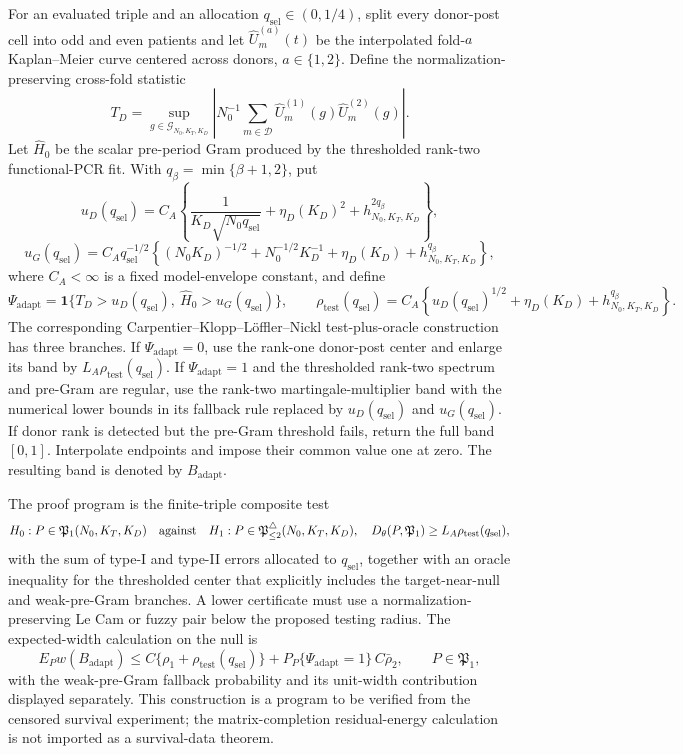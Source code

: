 For an evaluated triple and an allocation \(q_{\mathrm{sel}}\in(0,1/4)\), split every donor-post cell into odd and even patients and let \(\widehat U_m^{(a)}(t)\) be the interpolated fold-\(a\) Kaplan--Meier curve centered across donors, \(a\in\{1,2\}\).  Define the normalization-preserving cross-fold statistic
\[
 T_D=\sup_{g\in\mathcal G_{N_0,K_T,K_D}}
 \left|N_0^{-1}\sum_{m\in\mathcal D}
       \widehat U_m^{(1)}(g)\widehat U_m^{(2)}(g)\right|.
\]
Let \(\widehat H_0\) be the scalar pre-period Gram produced by the thresholded rank-two functional-PCR fit.  With \(q_\beta=\min\{\beta+1,2\}\), put
\[
 u_D(q_{\mathrm{sel}})=C_A\left\{
   \frac{1}{K_D\sqrt{N_0q_{\mathrm{sel}}}}
   +\eta_D(K_D)^2+h_{N_0,K_T,K_D}^{2q_\beta}\right\},
\]
\[
 u_G(q_{\mathrm{sel}})=C_Aq_{\mathrm{sel}}^{-1/2}\left\{
   (N_0K_D)^{-1/2}+N_0^{-1/2}K_D^{-1}
   +\eta_D(K_D)+h_{N_0,K_T,K_D}^{q_\beta}\right\},
\]
where \(C_A<\infty\) is a fixed model-envelope constant, and define
\[
 \Psi_{\mathrm{adapt}}
 =\mathbf 1\{T_D>u_D(q_{\mathrm{sel}}),\ \widehat H_0>u_G(q_{\mathrm{sel}})\},
 \qquad
 \rho_{\mathrm{test}}(q_{\mathrm{sel}})
 =C_A\left\{u_D(q_{\mathrm{sel}})^{1/2}
             +\eta_D(K_D)+h_{N_0,K_T,K_D}^{q_\beta}\right\}.
\]
The corresponding Carpentier--Klopp--L\"offler--Nickl test-plus-oracle construction has three branches.  If \(\Psi_{\mathrm{adapt}}=0\), use the rank-one donor-post center and enlarge its band by \(L_A\rho_{\mathrm{test}}(q_{\mathrm{sel}})\).  If \(\Psi_{\mathrm{adapt}}=1\) and the thresholded rank-two spectrum and pre-Gram are regular, use the rank-two martingale-multiplier band with the numerical lower bounds in its fallback rule replaced by \(u_D(q_{\mathrm{sel}})\) and \(u_G(q_{\mathrm{sel}})\).  If donor rank is detected but the pre-Gram threshold fails, return the full band \([0,1]\).  Interpolate endpoints and impose their common value one at zero.  The resulting band is denoted by \(B_{\mathrm{adapt}}\).

The proof program is the finite-triple composite test
\[
 H_0:P\in\mathfrak P_1(N_0,K_T,K_D)
 \quad\hbox{against}\quad
 H_1:P\in\mathfrak P_{\le2}^{\triangle}(N_0,K_T,K_D),\quad
 D_\theta(P,\mathfrak P_1)\ge L_A\rho_{\mathrm{test}}(q_{\mathrm{sel}}),
\]
with the sum of type-I and type-II errors allocated to \(q_{\mathrm{sel}}\), together with an oracle inequality for the thresholded center that explicitly includes the target-near-null and weak-pre-Gram branches.  A lower certificate must use a normalization-preserving Le Cam or fuzzy pair below the proposed testing radius.  The expected-width calculation on the null is
\[
 E_Pw(B_{\mathrm{adapt}})
 \le C\{\rho_1+\rho_{\mathrm{test}}(q_{\mathrm{sel}})\}
 +P_P\{\Psi_{\mathrm{adapt}}=1\}\,C\bar\rho_2,
 \qquad P\in\mathfrak P_1,
\]
with the weak-pre-Gram fallback probability and its unit-width contribution displayed separately.  This construction is a program to be verified from the censored survival experiment; the matrix-completion residual-energy calculation is not imported as a survival-data theorem.